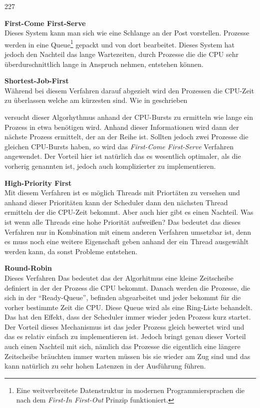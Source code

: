 \begin{dinglist}{227}
	\item{\textbf{First-Come First-Serve}} \\
	Dieses System kann man sich wie eine Schlange an der Post vorstellen. Prozesse werden in eine Queue\footnote{Eine weitverbreitete Datenstruktur in modernen Programmiersprachen die nach dem \textit{First-In First-Out} Prinzip funktioniert.} gepackt und von dort bearbeitet. Dieses System hat jedoch den Nachteil das lange Wartezeiten, durch Prozesse die die CPU sehr \"uberdurschnittlich lange in Anspruch nehmen, entstehen k\"onnen.\newpage
	\item{\textbf{Shortest-Job-First}}\\
	W\"ahrend bei diesem Verfahren darauf abgezielt wird den Prozessen die CPU-Zeit zu \"uberlassen welche am k\"urzesten sind. Wie in \cite[189]{scheduling} geschrieben 
\begin{quote}
\end{quote}
versucht dieser Algorhythmus anhand der CPU-Bursts\parencite[vgl.][184]{scheduling} zu ermitteln wie lange ein Prozess in etwa ben\"otigen wird. Anhand dieser Informationen wird dann der n\"achste Prozess ermittelt, der an der Reihe ist.
Sollten jedoch zwei Prozesse die gleichen CPU-Bursts haben, so wird das \textit{First-Come First-Serve} Verfahren angewendet. Der Vorteil hier ist nat\"urlich das es wesentlich optimaler, als die vorherig genannten ist, jedoch auch komplizierter zu implementieren.
\item{\textbf{High-Priority First}}\\
Mit diesem Verfahren ist es m\"oglich Threads mit Priort\"aten zu versehen und anhand dieser Priorit\"aten kann der Scheduler dann den n\"achsten Thread ermitteln der die CPU-Zeit bekommt. Aber auch hier gibt es einen Nachteil. Was ist wenn alle Threads eine hohe Priorit\"at aufwei\ss en? Das bedeutet das dieses Verfahren nur in Kombination mit einem anderen Verfahren umsetzbar ist, denn es muss noch eine weitere Eigenschaft geben anhand der ein Thread ausgew\"ahlt werden kann, da sonst Probleme entstehen.
	\item{\textbf{Round-Robin}}\\
	Dieses Verfahren 
		\parencite[vgl.][194]{scheduling}
Das bedeutet das der Algorhitmus eine kleine Zeitscheibe definiert in der der Prozess die CPU bekommt. Danach werden die Prozesse, die sich in der ``Ready-Queue'', befinden abgearbeitet und jeder bekommt f\"ur die vorher bestimmte Zeit die CPU. Diese Queue wird als eine Ring-Liste behandelt. Das hat den Effekt, dass der Scheduler immer wieder jeden Prozess kurz startet. Der Vorteil dieses Mechanismus ist das jeder Prozess gleich bewertet wird und das es relativ einfach zu implementieren ist. Jedoch bringt genau dieser Vorteil auch einen Nachteil mit sich, n\"amlich das Prozesse die eigentlich eine l\"angere Zeitscheibe br\"auchten immer warten m\"ussen bis sie wieder am Zug sind und das kann nat\"urlich zu sehr hohen Latenzen in der Ausf\"uhrung f\"uhren.
\end{dinglist}
